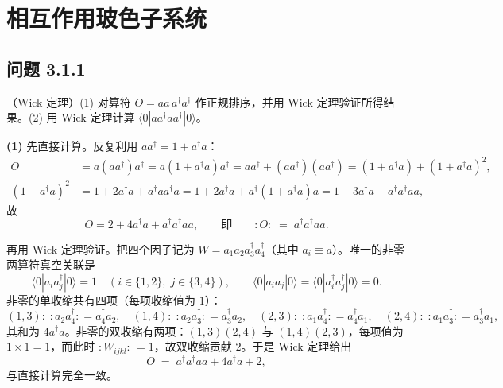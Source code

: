 \chapter{相互作用玻色子系统}

\section*{问题 3.1.1}
\begin{problem}
（Wick 定理）(1) 对算符 $O=aa\,a^{\dagger}a^{\dagger}$ 作正规排序，并用 Wick 定理验证所得结果。(2) 用 Wick 定理计算 $\langle 0|aa^{\dagger}aa^{\dagger}|0\rangle$。
\end{problem}
\solution

\textbf{(1)} 先直接计算。反复利用 $aa^{\dagger}=1+a^{\dagger}a$：
\begin{align*}
O&=a(aa^{\dagger})a^{\dagger}=a(1+a^{\dagger}a)a^{\dagger}=aa^{\dagger}+(aa^{\dagger})(aa^{\dagger})
=(1+a^{\dagger}a)+(1+a^{\dagger}a)^{2},\\
(1+a^{\dagger}a)^{2}&=1+2a^{\dagger}a+a^{\dagger}aa^{\dagger}a
=1+2a^{\dagger}a+a^{\dagger}(1+a^{\dagger}a)a
=1+3a^{\dagger}a+a^{\dagger}a^{\dagger}aa,
\end{align*}
故
\begin{equation*}
O=2+4a^{\dagger}a+a^{\dagger}a^{\dagger}aa,
\qquad\text{即}\qquad
:O:\;=\;a^{\dagger}a^{\dagger}aa .
\end{equation*}

再用 Wick 定理验证。把四个因子记为 $W=a_1a_2a_3^{\dagger}a_4^{\dagger}$（其中 $a_i\equiv a$）。唯一的非零两算符真空关联是
\begin{equation*}
\langle 0|a_i a_j^{\dagger}|0\rangle=1\quad(i\in\{1,2\},\;j\in\{3,4\}),\qquad
\langle 0|a_ia_j|0\rangle=\langle 0|a_i^{\dagger}a_j^{\dagger}|0\rangle=0 .
\end{equation*}
非零的单收缩共有四项（每项收缩值为 $1$）：
\begin{equation*}
(1,3):\;:a_2a_4^{\dagger}: =a_4^{\dagger}a_2,\quad
(1,4):\;:a_2a_3^{\dagger}: =a_3^{\dagger}a_2,\quad
(2,3):\;:a_1a_4^{\dagger}: =a_4^{\dagger}a_1,\quad
(2,4):\;:a_1a_3^{\dagger}: =a_3^{\dagger}a_1,
\end{equation*}
其和为 $4a^{\dagger}a$。非零的双收缩有两项：$(1,3)(2,4)$ 与 $(1,4)(2,3)$，每项值为 $1\times1=1$，而此时 $:W_{ijkl}:\,=1$，故双收缩贡献 $2$。于是 Wick 定理给出
\begin{equation*}
O\;=\;a^{\dagger}a^{\dagger}aa+4a^{\dagger}a+2 ,
\end{equation*}
与直接计算完全一致。

